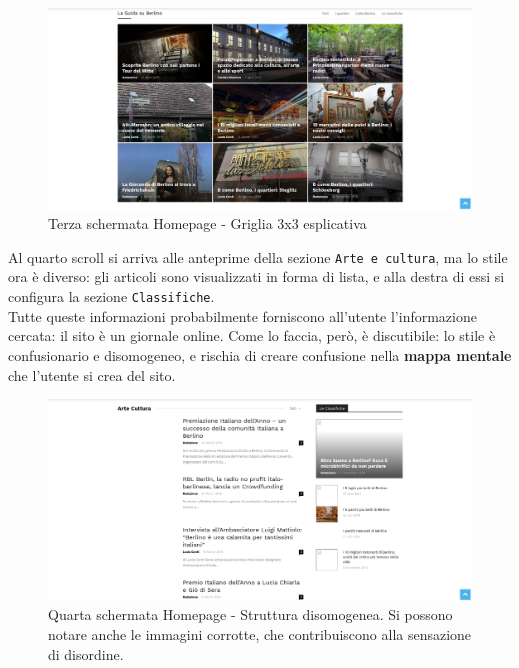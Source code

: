\begin{figure}[htbp]
\begin{center}
\includegraphics[width=35em]{img/home3}
\caption{Terza schermata Homepage - Griglia 3x3 esplicativa}
\end{center}
\end{figure}
\vspace{30pt}


Al quarto scroll si arriva alle anteprime della sezione \texttt{Arte e cultura}, ma lo stile ora è diverso: gli articoli sono visualizzati in forma di lista, e alla destra di essi si configura la sezione \texttt{Classifiche}. \\
Tutte queste informazioni probabilmente forniscono all'utente l'informazione cercata: il sito è un giornale online. Come lo faccia, però, è discutibile: lo stile è confusionario e disomogeneo, e rischia di creare confusione nella \textbf{mappa mentale} che l'utente si crea del sito. \\

\vspace{30pt}
\begin{figure}[htbp]
\begin{center}
\includegraphics[width=35em]{img/home4}
\caption{Quarta schermata Homepage - Struttura disomogenea. Si possono notare anche le immagini corrotte, che contribuiscono alla sensazione di disordine.}
\end{center}
\end{figure}
\vspace{30pt}

